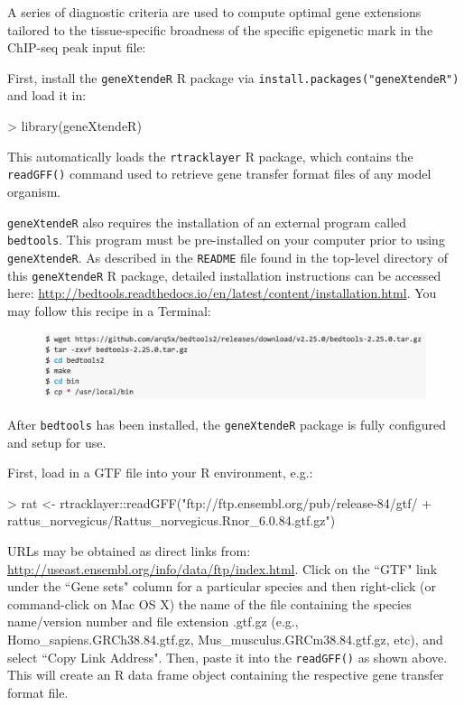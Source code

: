 \documentclass[12pt]{article}
\begin{document}
A series of diagnostic criteria are used to compute optimal gene extensions tailored to the tissue-specific broadness of the specific epigenetic mark in the ChIP-seq peak input file:

First, install the \texttt{geneXtendeR} R package via \texttt{install.packages("geneXtendeR")} and load it in:

\begin{Schunk}
\begin{Sinput}
> library(geneXtendeR)
\end{Sinput}
\end{Schunk}

This automatically loads the \texttt{rtracklayer} R package, which contains the \texttt{readGFF()} command used to retrieve gene transfer format files of any model organism.

\texttt{geneXtendeR} also requires the installation of an external program called \texttt{bedtools}.  This program must be pre-installed on your computer prior to using \texttt{geneXtendeR}.  As described in the \texttt{README} file found in the top-level directory of this \texttt{geneXtendeR} R package, detailed installation instructions can be accessed here: \url{http://bedtools.readthedocs.io/en/latest/content/installation.html}.  You may follow this recipe in a Terminal:

\begin{figure}[H]
\centering
\includegraphics{figures/bedtoolsInstallation.png}
\end{figure}

After \texttt{bedtools} has been installed, the \texttt{geneXtendeR} package is fully configured and setup for use. 

First, load in a GTF file into your R environment, e.g.:

\begin{Schunk}
\begin{Sinput}
> rat <- rtracklayer::readGFF("ftp://ftp.ensembl.org/pub/release-84/gtf/
+                       rattus_norvegicus/Rattus_norvegicus.Rnor_6.0.84.gtf.gz")
\end{Sinput}
\end{Schunk}

URLs may be obtained as direct links from: \url{http://useast.ensembl.org/info/data/ftp/index.html}.  Click on the ``GTF" link under the ``Gene sets" column for a particular species and then right-click (or command-click on Mac OS X) the name of the file containing the species name/version number and file extension .gtf.gz (e.g., Homo\_sapiens.GRCh38.84.gtf.gz, Mus\_musculus.GRCm38.84.gtf.gz, etc), and select ``Copy Link Address".  Then, paste it into the \texttt{readGFF()} as shown above.  This will create an R data frame object containing the respective gene transfer format file.
\end{document}
